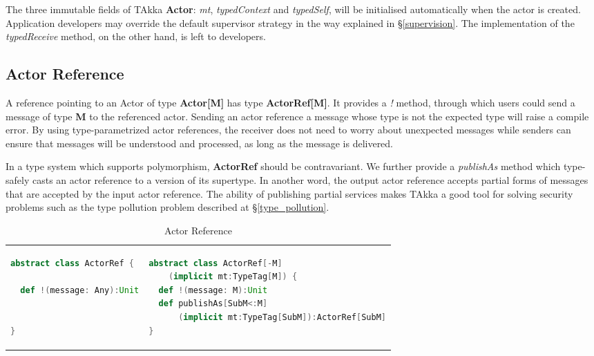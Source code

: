 The three immutable fields of TAkka {\bf Actor}: {\it mt}, {\it typedContext} and {\it
typedSelf}, will be initialised automatically when the actor is created.
Application developers may override the default supervisor strategy in the way
explained in \S\ref{supervision}.  The implementation of the {\it typedReceive}
method, on the other hand, is left to developers.


\subsection{Actor Reference}
\label{actor_ref}
A reference pointing to an Actor of type {\bf Actor[M]} has type {\bf ActorRef[M]}.  It provides a {\it !} method, through which users could send a message of type {\bf M} to the referenced actor.  Sending an actor reference a message whose type is not the
expected type will raise a compile error.  By using type-parametrized actor
references, the receiver does not need to worry about unexpected messages while
senders can ensure that messages will be understood and processed, as long as
the message is delivered.

In a type system which supports polymorphism, {\bf ActorRef} should be
contravariant.  We further provide a {\it publishAs} method which type-safely
casts an actor reference to a version of its supertype.  In another word, the
output actor reference accepts partial forms of messages that are accepted by
the input actor reference.  The ability of publishing partial services makes
TAkka a good tool for solving security problems such as the type pollution
problem described at \S\ref{type_pollution}.

\begin{table}[h]
\label{ActorRef}
  \begin{tabular}{ l  l }
      \begin{lstlisting}[language=scala]
abstract class ActorRef {

  def !(message: Any):Unit
  
  
}
    \end{lstlisting} 
    &
    \begin{lstlisting}[language=scala]
abstract class ActorRef[-M]
    (implicit mt:TypeTag[M]) {
  def !(message: M):Unit
  def publishAs[SubM<:M]
      (implicit mt:TypeTag[SubM]):ActorRef[SubM]
}
    \end{lstlisting}     
  \end{tabular}
    \caption{Actor Reference}
\end{table}


